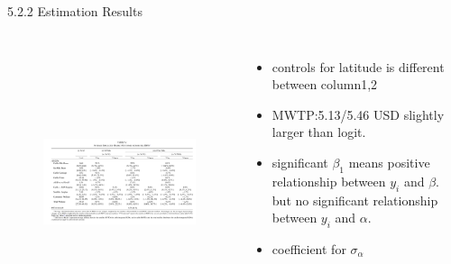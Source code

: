 \documentclass[10pt]{beamer}
\begin{document}
\begin{frame}{5.2.2 Estimation Results}
    \begin{columns}[c] 
    \column{9cm}
    \begin{figure}
        \centering
        \includegraphics[height=8cm]{table5}
    \end{figure}
    \column{4cm}
    \begin{itemize}
        \item controls for latitude is different between column1,2
        \item MWTP:5.13/5.46 USD slightly larger than logit.
        \item significant $\beta_1$ means positive relationship between $y_i$ and $\beta$. but no significant relationship between $y_i$ and $\alpha$.
        \item coefficient for $\sigma_\alpha$
    \end{itemize}
	\end{columns}
\end{frame}
\end{document}
